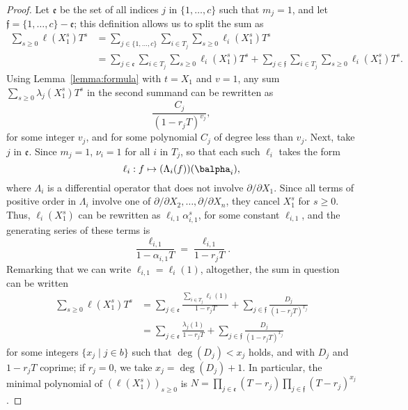 \documentclass[12pt]{article}
\begin{document}
\begin{proof}
Let $\mathfrak{e}$ be the set of all indices $j$ in $\{1,\dots,c\}$
such that $m_j=1$, and let $\mathfrak{f}=\{1,\dots,c\}-\mathfrak{e}$;
this definition allows us to split the sum as
\begin{align*}
\sum_{s \ge 0} \ell(X_1^s) T^s  
&= \sum_{j \in \{1,\dots,c\}}\sum_{i\in T_j} 
\sum_{s \ge 0}\ell_i(X_1^s)T^s  \\
&=\sum_{j \in \mathfrak{e}}\sum_{i\in T_j}\sum_{s \ge 0}  \ell_i(X_1^s)T^s +
\sum_{j \in \mathfrak{f}}\sum_{i\in T_j}\sum_{s \ge 0}  \ell_i(X_1^s)T^s.
\end{align*}
Using Lemma~\ref{lemma:formula} with $t=X_1$ and $v=1$, any sum $\sum_{s \ge 0} \lambda_j(X_1^s)T^s$ 
in the second summand
can be rewritten as 
$$\frac{C_j}{(1-r_j T)^{v_j}},$$
for some integer $v_j$, and for some polynomial $C_j$ of degree less than
$v_j$. Next, take $j$ in $\mathfrak{e}$. Since $m_j=1$, $\nu_i=1$ for all $i$ in $T_j$,
 so that
each such $\ell_i$ takes the form 
$$\ell_i: f \mapsto (\Lambda_{i}(f))(\balpha_i),$$ where $\Lambda_{i}$
is a differential operator that does not involve $\partial/\partial
X_1$. Since all terms of positive order in $\Lambda_i$ involve one of
$\partial/\partial X_2,\dots,\partial/\partial X_n$, they cancel
$X_1^s$ for $s\ge 0$. Thus, $\ell_i(X_1^s)$ can be rewritten 
as $\ell_{i,1} \alpha_{i,1}^s$, for some constant $\ell_{i,1}$,
and the generating series of these terms is 
$$\frac {\ell_{i,1}}{1-\alpha_{i,1}T}=\frac {\ell_{i,1}}{1-r_j T}.$$
Remarking  that we can write $\ell_{i,1}=\ell_i(1)$,
altogether, the sum in question can be written
\begin{align*}
\sum_{s \ge 0} \ell(X_1^s) T^s  
&=\sum_{j \in \mathfrak{e}} 
\frac{ \sum_{i\in T_j}  \ell_{i}(1) }{1-r_j T}
+ \sum_{j \in \mathfrak{f}} \frac{D_j}{(1-r_j T)^{x_j}}\\
&= \sum_{j \in \mathfrak{e}} 
\frac{ \lambda_j(1) }{1-r_j T}
+ \sum_{j \in \mathfrak{f}} \frac{D_j}{(1-r_j T)^{x_j}}
\end{align*}
for some integers $\{x_j \mid j \in b\}$ such that $\deg(D_j) < x_j$
holds, and with $D_j$ and $1-r_j T$ coprime; if $r_j=0$, we take
$x_j=\deg(D_j)+1$. In particular, the minimal polynomial of
$(\ell(X_1^s))_{s\ge 0}$ is $N=\prod_{j\in \mathfrak{e}}(T-r_j)
\prod_{j \in \mathfrak{f}}(T-r_j)^{x_j}$.


\end{proof}
\end{document}
